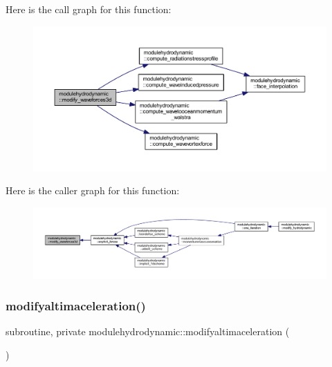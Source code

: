 Here is the call graph for this function\+:\nopagebreak
\begin{figure}[H]
\begin{center}
\leavevmode
\includegraphics[width=350pt]{namespacemodulehydrodynamic_abb5a03f6dfc75e5c036b503550a4e315_cgraph}
\end{center}
\end{figure}
Here is the caller graph for this function\+:\nopagebreak
\begin{figure}[H]
\begin{center}
\leavevmode
\includegraphics[width=350pt]{namespacemodulehydrodynamic_abb5a03f6dfc75e5c036b503550a4e315_icgraph}
\end{center}
\end{figure}
\mbox{\label{namespacemodulehydrodynamic_a56519157850cefc5f98f52914553161e}} 
\subsubsection{\texorpdfstring{modifyaltimaceleration()}{modifyaltimaceleration()}}
{\footnotesize\ttfamily subroutine, private modulehydrodynamic\+::modifyaltimaceleration (\begin{DoxyParamCaption}{ }\end{DoxyParamCaption})\hspace{0.3cm}{\ttfamily [private]}}

